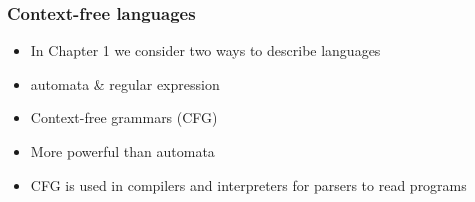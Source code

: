 




 \begin{frame}[allowframebreaks] \frametitle{Context-free languages}
  \begin{itemize}
\item In Chapter 1 we consider two ways to describe languages

\item [] automata \& regular expression
\item Context-free grammars (CFG)

\item [] More powerful than automata
\item CFG is used in compilers and interpreters
for parsers to read programs

\end{itemize}\end{frame}

